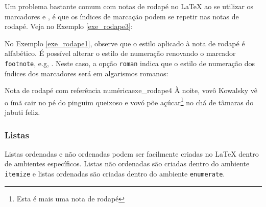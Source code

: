 Um problema bastante comum com notas de rodapé no LaTeX ao se utilizar os marcadores \texttt{\footenotemark} e \texttt{\footnotetext}, é que os índices de marcação podem se repetir nas notas de rodapé. Veja no Exemplo \ref{exe_rodape3}:



No Exemplo \ref{exe_rodape1}, observe que o estilo aplicado à nota de rodapé é alfabético. É possível alterar o estilo de numeração renovando o marcador {\tt footnote}, e.g, \texttt{\renewcommand{\thefootnote}{\roman{footnote}}}. Neste caso, a opção {\tt roman} indica que o estilo de numeração dos índices dos marcadores será em algarismos romanos:

\renewcommand{\thefootnote}{\roman{footnote}}

\begin{texexptitled}[breakable,enhanced,middle=2mm]{Nota de rodapé com referência numérica}{exe_rodape4}
À noite, vovô Kowalsky vê o ímã\footnotemark{} cair no pé do pinguim queixoso\footnotemark{} e vovó põe açúcar\footnote{Esta é mais uma nota de rodapé} no chá de tâmaras do jabuti feliz.

\end{texexptitled}

\subsubsection*{Listas}
\label{sec:listas}

Listas ordenadas e não ordenadas podem ser facilmente criadas no LaTeX dentro de ambientes específicos. Listas não ordenadas são criadas dentro do ambiente \texttt{itemize} e listas ordenadas são criadas dentro do ambiente \texttt{enumerate}.

